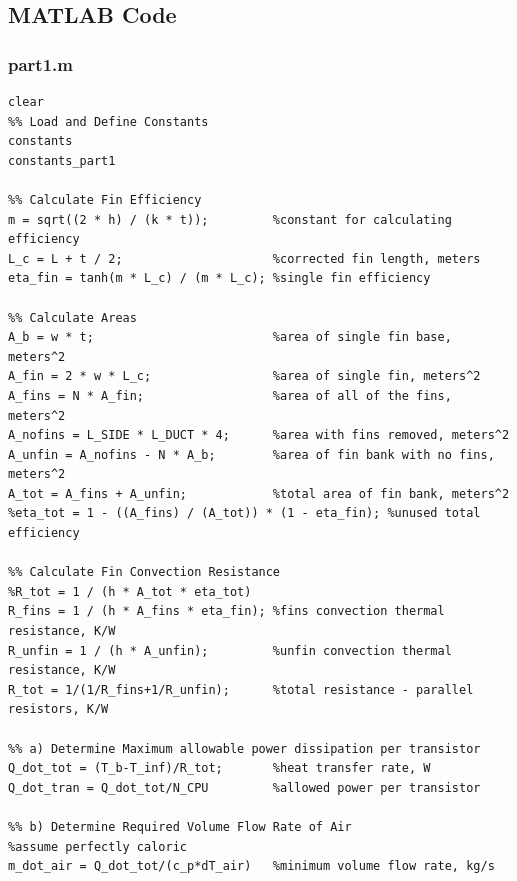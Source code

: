 \documentclass[12pt, titlepage]{article}
\begin{document}
\subsection{MATLAB Code}
\subsubsection{part1.m}
\begin{verbatim}
clear
%% Load and Define Constants
constants
constants_part1

%% Calculate Fin Efficiency
m = sqrt((2 * h) / (k * t));         %constant for calculating efficiency
L_c = L + t / 2;                     %corrected fin length, meters
eta_fin = tanh(m * L_c) / (m * L_c); %single fin efficiency

%% Calculate Areas
A_b = w * t;                         %area of single fin base, meters^2
A_fin = 2 * w * L_c;                 %area of single fin, meters^2
A_fins = N * A_fin;                  %area of all of the fins, meters^2
A_nofins = L_SIDE * L_DUCT * 4;      %area with fins removed, meters^2
A_unfin = A_nofins - N * A_b;        %area of fin bank with no fins, meters^2
A_tot = A_fins + A_unfin;            %total area of fin bank, meters^2
%eta_tot = 1 - ((A_fins) / (A_tot)) * (1 - eta_fin); %unused total efficiency

%% Calculate Fin Convection Resistance
%R_tot = 1 / (h * A_tot * eta_tot) 
R_fins = 1 / (h * A_fins * eta_fin); %fins convection thermal resistance, K/W
R_unfin = 1 / (h * A_unfin);         %unfin convection thermal resistance, K/W
R_tot = 1/(1/R_fins+1/R_unfin);      %total resistance - parallel resistors, K/W

%% a) Determine Maximum allowable power dissipation per transistor
Q_dot_tot = (T_b-T_inf)/R_tot;       %heat transfer rate, W
Q_dot_tran = Q_dot_tot/N_CPU         %allowed power per transistor

%% b) Determine Required Volume Flow Rate of Air
%assume perfectly caloric
m_dot_air = Q_dot_tot/(c_p*dT_air)   %minimum volume flow rate, kg/s
\end{verbatim}
\noindent
\end{document}
